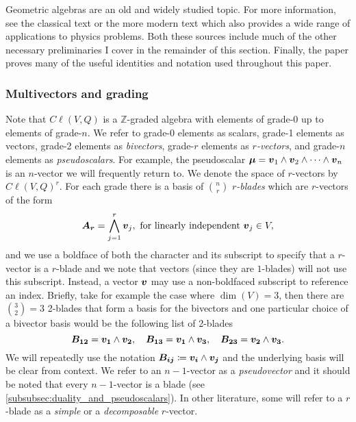 Geometric algebras are an old and widely studied topic. For more information, see the classical text \cite{hestenes_clifford_1986} or the more modern text \cite{doran_geometric_2003} which also provides a wide range of applications to physics problems. Both these sources include much of the other necessary preliminaries I cover in the remainder of this section. Finally, the paper \cite{chisolm_geometric_2012} proves many of the useful identities and notation used throughout this paper.

\subsubsection{Multivectors and grading}
Note that $C\ell(V,Q)$ is a $\mathbb{Z}$-graded algebra with elements of grade-0 up to elements of grade-$n$. We refer to grade-0 elements as scalars, grade-1 elements as vectors, grade-2 elements as \emph{bivectors}, grade-$r$ elements as \emph{$r$-vectors}, and grade-$n$ elements as \emph{pseudoscalars}. For example, the pseudoscalar $\boldsymbol{\mu} = \boldsymbol{v}_1 \wedge \boldsymbol{v}_2 \wedge \cdots \wedge \boldsymbol{v}_n$ is an $n$-vector we will frequently return to. We denote the space of $r$-vectors by $C\ell(V,Q)^r$. For each grade there is a basis of ${n\choose r}$ \emph{$r$-blades} which are $r$-vectors of the form
\begin{equation}
\label{eq:blade}
\boldsymbol{A_r} = \bigwedge_{j=1}^r \boldsymbol{v}_j, ~\textrm{for linearly independent}~ \boldsymbol{v}_j \in V,
\end{equation}
and we use a boldface of both the character and its subscript to specify that a $r$-vector is a $r$-blade and we note that vectors (since they are $1$-blades) will not use this subscript. Instead, a vector $\boldsymbol{v}$ may use a non-boldfaced subscript to reference an index. Briefly, take for example the case where $\dim(V)=3$, then there are ${3\choose 2}=3$ 2-blades that form a basis for the bivectors and one particular choice of a bivector basis would be the following list of 2-blades
\begin{equation}
\label{eq:3_dim_basis}
\boldsymbol{B_{12}} = \boldsymbol{v_1} \wedge \boldsymbol{v_2}, \quad \boldsymbol{B_{13}} = \boldsymbol{v_1} \wedge \boldsymbol{v_3}, \quad \boldsymbol{B_{23}} = \boldsymbol{v_2} \wedge \boldsymbol{v_3}.
\end{equation}
We will repeatedly use the notation $\boldsymbol{B_{ij}} \coloneqq \boldsymbol{v_i}\wedge \boldsymbol{v_j}$ and the underlying basis will be clear from context. We refer to an $n-1$-vector as a \emph{pseudovector} and it should be noted that every $n-1$-vector is a blade (see \cref{subsubsec:duality_and_pseudoscalars}). In other literature, some will refer to a $r$-blade as a \emph{simple} or a \emph{decomposable} $r$-vector. 

